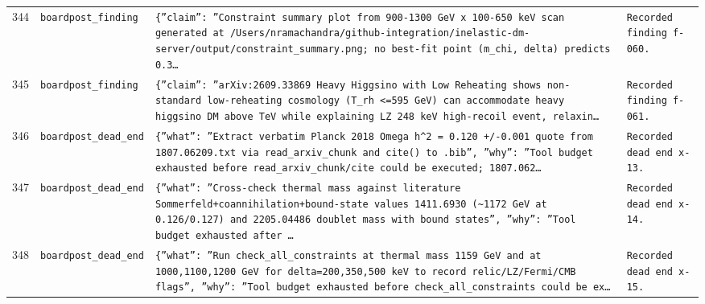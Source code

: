 \documentclass[11pt,a4paper]{article}
\begin{document}
\begin{longtable}{@{}p{}p{}p{}p{}@{}}
344 & \texttt{board}\newline\texttt{post\_\allowbreak{}finding} & \texttt{\{''claim'':\allowbreak{} ''Constraint summary plot from 900-1300 GeV x 100-650 keV scan generated at /\allowbreak{}Users/\allowbreak{}nramachandra/\allowbreak{}github-integration/\allowbreak{}inelastic-dm-server/\allowbreak{}output/\allowbreak{}constraint\_\allowbreak{}summary.png;\allowbreak{} no best-fit point (m\_\allowbreak{}chi,\allowbreak{} delta)\allowbreak{} predicts 0.3\ldots{}\allowbreak{}} & \texttt{Recorded finding f-060.} \\
345 & \texttt{board}\newline\texttt{post\_\allowbreak{}finding} & \texttt{\{''claim'':\allowbreak{} ''arXiv:\allowbreak{}2609.33869 Heavy Higgsino with Low Reheating shows non-standard low-reheating cosmology (T\_\allowbreak{}rh \textless{}\allowbreak{}=\allowbreak{}595 GeV)\allowbreak{} can accommodate heavy higgsino DM above TeV while explaining LZ 248 keV high-recoil event,\allowbreak{} relaxin\ldots{}\allowbreak{}} & \texttt{Recorded finding f-061.} \\
346 & \texttt{board}\newline\texttt{post\_\allowbreak{}dead\_\allowbreak{}end} & \texttt{\{''what'':\allowbreak{} ''Extract verbatim Planck 2018 Omega h\textasciicircum{}\allowbreak{}2 =\allowbreak{} 0.120 +/\allowbreak{}-0.001 quote from 1807.06209.txt via read\_\allowbreak{}arxiv\_\allowbreak{}chunk and cite()\allowbreak{} to .bib'',\allowbreak{} ''why'':\allowbreak{} ''Tool budget exhausted before read\_\allowbreak{}arxiv\_\allowbreak{}chunk/\allowbreak{}cite could be executed;\allowbreak{} 1807.062\ldots{}\allowbreak{}} & \texttt{Recorded dead end x-13.} \\
347 & \texttt{board}\newline\texttt{post\_\allowbreak{}dead\_\allowbreak{}end} & \texttt{\{''what'':\allowbreak{} ''Cross-check thermal mass against literature Sommerfeld+coannihilation+bound-state values 1411.6930 (\textasciitilde{}\allowbreak{}1172 GeV at 0.126/\allowbreak{}0.127)\allowbreak{} and 2205.04486 doublet mass with bound states'',\allowbreak{} ''why'':\allowbreak{} ''Tool budget exhausted after \ldots{}\allowbreak{}} & \texttt{Recorded dead end x-14.} \\
348 & \texttt{board}\newline\texttt{post\_\allowbreak{}dead\_\allowbreak{}end} & \texttt{\{''what'':\allowbreak{} ''Run check\_\allowbreak{}all\_\allowbreak{}constraints at thermal mass 1159 GeV and at 1000,\allowbreak{}1100,\allowbreak{}1200 GeV for delta=\allowbreak{}200,\allowbreak{}350,\allowbreak{}500 keV to record relic/\allowbreak{}LZ/\allowbreak{}Fermi/\allowbreak{}CMB flags'',\allowbreak{} ''why'':\allowbreak{} ''Tool budget exhausted before check\_\allowbreak{}all\_\allowbreak{}constraints could be ex\ldots{}\allowbreak{}} & \texttt{Recorded dead end x-15.} \\

\end{longtable}
\end{document}
